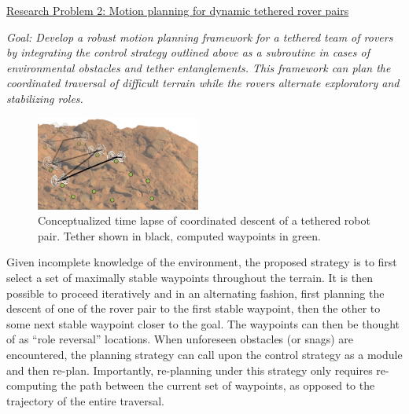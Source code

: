 \documentclass[12pt]{article}
\begin{document}

\noindent\underline{Research Problem 2: Motion planning for dynamic
  tethered rover pairs }

{\sl Goal: Develop a robust motion planning framework for a tethered
  team of rovers by integrating the control strategy outlined above as
  a subroutine in cases of environmental obstacles and tether
  entanglements. This framework can plan the coordinated traversal of
  difficult terrain while the rovers alternate exploratory and
  stabilizing roles. }

\begin{figure}
  \begin{center}
	\vspace{-0.4in}	
	\includegraphics[width=0.48\textwidth, left]{descent_2.png}
  \end{center}
  \vspace{-0.2in}
  \label{fig:descent}
  \caption{Conceptualized time lapse of coordinated descent of a tethered robot pair. Tether shown in black, computed 
  waypoints in green.} \vspace{-.2in}
\end{figure}



Given incomplete knowledge of the environment, the proposed strategy
is to first select a set of maximally stable waypoints throughout the
terrain. It is then possible to proceed iteratively and in an
alternating fashion, first planning the descent of one of the rover
pair to the first stable waypoint, then the other to some next stable
waypoint closer to the goal. The waypoints can then be thought of as
``role reversal'' locations. When unforeseen obstacles (or snags) are
encountered, the planning strategy can call upon the control strategy
as a module and then re-plan.  Importantly, re-planning under this
strategy only requires re-computing the path between the current set
of waypoints, as opposed to the trajectory of the entire traversal.
\end{document}

